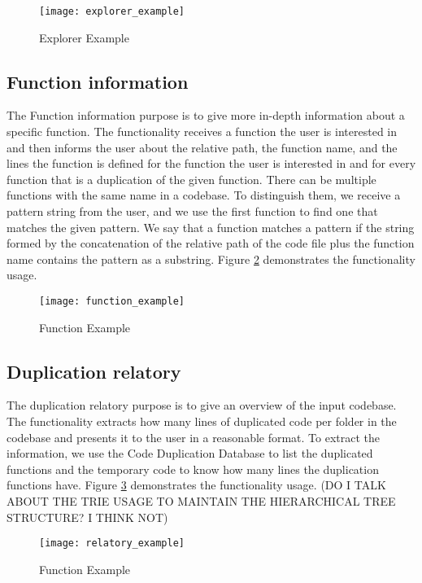 \begin{figure}
\texttt{[image: explorer\_example]}
\caption{Explorer Example}
\label{fig:explorer_ex}
\end{figure}


\subsection{Function information}

\label{subsec:functioncommand}

The Function information purpose is to give more in-depth information about a specific 
function. The functionality receives a function the user is interested in and then 
informs the user about the relative path, the function name, and the lines the function 
is defined for the function the user is interested in and for every function that is a 
duplication of the given function. There can be multiple functions with the same name 
in a codebase. To distinguish them, we receive a pattern string from the user, and we 
use the first function to find one that matches the given pattern. We say that a 
function matches a pattern if the string formed by the concatenation of the relative 
path of the code file plus the function name contains the pattern as a substring. 
Figure \ref{fig:function_ex} demonstrates the functionality usage.

\begin{figure}
\texttt{[image: function\_example]}
\caption{Function Example}
\label{fig:function_ex}
\end{figure}


\subsection{Duplication relatory}

The duplication relatory purpose is to give an overview of the input codebase. 
The functionality extracts how many lines of duplicated code per folder in the 
codebase and presents it to the user in a reasonable format. To extract the 
information, we use the Code Duplication Database to list the duplicated functions 
and the temporary code to know how many lines the duplication functions have. 
Figure \ref{fig:relatory_ex} demonstrates the functionality usage. 
(DO I TALK ABOUT THE TRIE USAGE TO MAINTAIN THE HIERARCHICAL TREE STRUCTURE? I THINK NOT)

\begin{figure}
\texttt{[image: relatory\_example]}
\caption{Function Example}
\label{fig:relatory_ex}
\end{figure}





